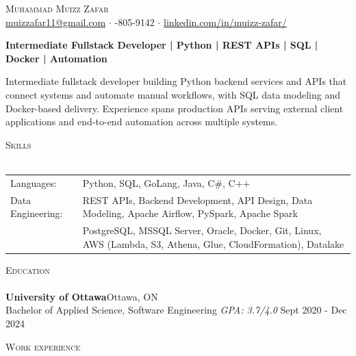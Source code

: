 \documentclass[a4paper]{article}
\newcommand{\lineunder} {
    \vspace*{-8pt} \\
    \hspace*{-18pt} \hrulefill \\
}
\newcommand{\header} [1] {
    {\hspace*{-18pt}\vspace*{6pt} \textsc{#1}}
    \vspace*{-6pt} \lineunder
}
\begin{document}
\vspace*{-40pt}

\vspace*{-10pt}
\begin{center}
	{\Huge \scshape {Muhammad Muizz Zafar}}\\
	\faSend \space \href{mailto:muizzafar11@gmail.com}{muizzafar11@gmail.com} $\cdot$ \faPhoneSquare {}-805-9142 $\cdot$ \faLinkedinSquare \space \href{https://www.linkedin.com/in/muizz-zafar/}{linkedin.com/in/muizz-zafar/}
	\\
\end{center}

\vspace{-5pt}
\begin{center}
\textbf{Intermediate Fullstack Developer | Python | REST APIs | SQL | Docker | Automation}
\end{center}
\begin{center}
Intermediate fullstack developer building Python backend services and APIs that connect systems and automate manual workflows, with SQL data modeling and Docker-based delivery. Experience spans production APIs serving external client applications and end-to-end automation across multiple systems.
\end{center}

\header{Skills}
\begin{tabular}{ l l }
	Languages: 
& Python, SQL, GoLang, Java, C\#, C++ \\

Data Engineering: 
& REST APIs, Backend Development, API Design, Data Modeling, Apache Airflow, PySpark, Apache Spark\\
& PostgreSQL, MSSQL Server, Oracle, Docker, Git, Linux, AWS (Lambda, S3, Athena, Glue, CloudFormation), Datalake

\end{tabular}

\header{Education}
\textbf{University of Ottawa}\hfill Ottawa, ON\\
Bachelor of Applied Science, Software Engineering \textit{GPA: 3.7/4.0} \hfill Sept 2020 - Dec 2024\\
\vspace{2mm}

\header{Work experience}
\vspace{1.5mm}
\end{document}
